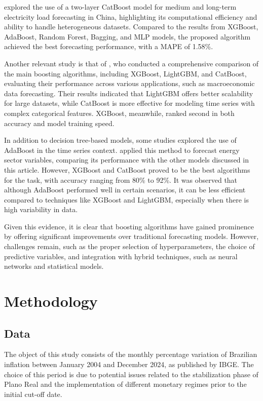 \cite{XIANGCATBOOST} explored the use of a two-layer CatBoost model for medium and long-term electricity load forecasting in China, highlighting its computational efficiency and ability to handle heterogeneous datasets. Compared to the results from XGBoost, AdaBoost, Random Forest, Bagging, and MLP models, the proposed algorithm achieved the best forecasting performance, with a MAPE of 1.58\%.

Another relevant study is that of \cite{bentejac2021comparative}, who conducted a comprehensive comparison of the main boosting algorithms, including XGBoost, LightGBM, and CatBoost, evaluating their performance across various applications, such as macroeconomic data forecasting. Their results indicated that LightGBM offers better scalability for large datasets, while CatBoost is more effective for modeling time series with complex categorical features. XGBoost, meanwhile, ranked second in both accuracy and model training speed.

In addition to decision tree-based models, some studies explored the use of AdaBoost in the time series context. \cite{khan2021boosting} applied this method to forecast energy sector variables, comparing its performance with the other models discussed in this article. However, XGBoost and CatBoost proved to be the best algorithms for the task, with accuracy ranging from 80\% to 92\%. It was observed that although AdaBoost performed well in certain scenarios, it can be less efficient compared to techniques like XGBoost and LightGBM, especially when there is high variability in data.

Given this evidence, it is clear that boosting algorithms have gained prominence by offering significant improvements over traditional forecasting models. However, challenges remain, such as the proper selection of hyperparameters, the choice of predictive variables, and integration with hybrid techniques, such as neural networks and statistical models.

\section{Methodology}
\subsection{Data}
The object of this study consists of the monthly percentage variation of Brazilian inflation between January 2004 and December 2024, as published by IBGE. The choice of this period is due to potential issues related to the stabilization phase of Plano Real and the implementation of different monetary regimes prior to the initial cut-off date.

